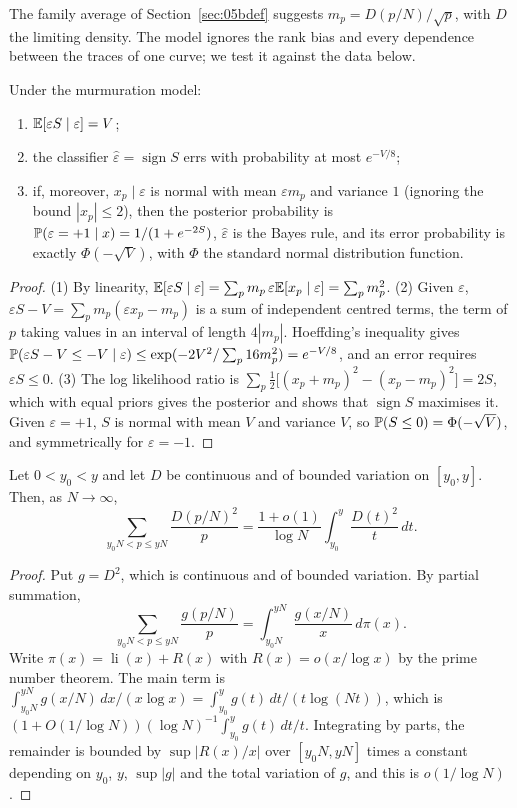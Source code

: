 The family average of Section~\ref{sec:05bdef} suggests $m_p=D(p/N)/\sqrt p$, with $D$ the limiting density. The model ignores the rank bias and every dependence between the traces of one curve; we test it against the data below.

\begin{proposition}\label{prop:05bclass}
Under the murmuration model:
\begin{enumerate}
\item $\mathbb{E}[\varepsilon S\mid\varepsilon]=V$;
\item the classifier $\hat\varepsilon=\operatorname{sign}S$ errs with probability at most $e^{-V/8}$;
\item if, moreover, $x_p\mid\varepsilon$ is normal with mean $\varepsilon m_p$ and variance $1$ (ignoring the bound $|x_p|\le2$), then the posterior probability is $\mathbb{P}(\varepsilon=+1\mid x)=1/(1+e^{-2S})$, $\hat\varepsilon$ is the Bayes rule, and its error probability is exactly $\Phi(-\sqrt V)$, with $\Phi$ the standard normal distribution function.
\end{enumerate}
\end{proposition}

\begin{proof}
(1) By linearity, $\mathbb{E}[\varepsilon S\mid\varepsilon]=\sum_pm_p\,\varepsilon\mathbb{E}[x_p\mid\varepsilon]=\sum_pm_p^2$.
(2) Given $\varepsilon$, $\varepsilon S-V=\sum_pm_p(\varepsilon x_p-m_p)$ is a sum of independent centred terms, the term of $p$ taking values in an interval of length $4|m_p|$. Hoeffding's inequality gives $\mathbb{P}(\varepsilon S-V\le-V\mid\varepsilon)\le\exp(-2V^2/\sum_p16m_p^2)=e^{-V/8}$, and an error requires $\varepsilon S\le0$.
(3) The log likelihood ratio is $\sum_p\frac12\bigl[(x_p+m_p)^2-(x_p-m_p)^2\bigr]=2S$, which with equal priors gives the posterior and shows that $\operatorname{sign}S$ maximises it. Given $\varepsilon=+1$, $S$ is normal with mean $V$ and variance $V$, so $\mathbb{P}(S\le0)=\Phi(-\sqrt V)$, and symmetrically for $\varepsilon=-1$.
\end{proof}

\begin{lemma}\label{lem:05bsignal}
Let $0<y_0<y$ and let $D$ be continuous and of bounded variation on $[y_0,y]$. Then, as $N\to\infty$,
\[
\sum_{y_0N<p\le yN}\frac{D(p/N)^2}{p}=\frac{1+o(1)}{\log N}\int_{y_0}^{y}\frac{D(t)^2}{t}\,dt.
\]
\end{lemma}

\begin{proof}
Put $g=D^2$, which is continuous and of bounded variation. By partial summation,
\[
\sum_{y_0N<p\le yN}\frac{g(p/N)}{p}=\int_{y_0N}^{yN}\frac{g(x/N)}{x}\,d\pi(x).
\]
Write $\pi(x)=\operatorname{li}(x)+R(x)$ with $R(x)=o(x/\log x)$ by the prime number theorem. The main term is $\int_{y_0N}^{yN}g(x/N)\,dx/(x\log x)=\int_{y_0}^{y}g(t)\,dt/(t\log(Nt))$, which is $(1+O(1/\log N))(\log N)^{-1}\int_{y_0}^yg(t)\,dt/t$. Integrating by parts, the remainder is bounded by $\sup|R(x)/x|$ over $[y_0N,yN]$ times a constant depending on $y_0$, $y$, $\sup|g|$ and the total variation of $g$, and this is $o(1/\log N)$.
\end{proof}

